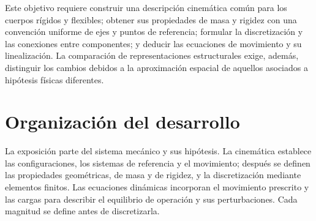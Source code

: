 Este objetivo requiere construir una descripción cinemática común para los cuerpos rígidos y flexibles; obtener sus propiedades de masa y rigidez con una convención uniforme de ejes y puntos de referencia; formular la discretización y las conexiones entre componentes; y deducir las ecuaciones de movimiento y su linealización. La comparación de representaciones estructurales exige, además, distinguir los cambios debidos a la aproximación espacial de aquellos asociados a hipótesis físicas diferentes.

\section{Organización del desarrollo}
La exposición parte del sistema mecánico y sus hipótesis. La cinemática establece las configuraciones, los sistemas de referencia y el movimiento; después se definen las propiedades geométricas, de masa y de rigidez, y la discretización mediante elementos finitos. Las ecuaciones dinámicas incorporan el movimiento prescrito y las cargas para describir el equilibrio de operación y sus perturbaciones. Cada magnitud se define antes de discretizarla.

